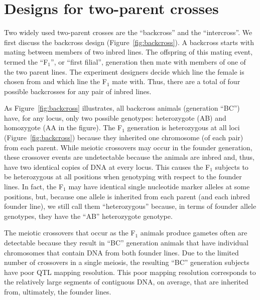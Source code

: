 \documentclass[oneside]{book}\usepackage[]{graphicx}\usepackage[]{color}
\begin{document}


\section{Designs for two-parent crosses}\label{sec:two-parent-designs}

Two widely used two-parent crosses are the ``backcross'' and the ``intercross''. We first discuss the backcross design (Figure~\ref{fig:backcross}). A backcross starts with mating between members of two inbred lines. The offspring of this mating event, termed the ``F$_1$'', or ``first filial'', generation then mate with members of one of the two parent lines. The experiment designers decide which line the female is chosen from and which line the F$_1$ mate with. Thus, there are a total of four possible backcrosses for any pair of inbred lines. 

As Figure~\ref{fig:backcross} illustrates, all backcross animals (generation ``BC'') have, for any locus, only two possible genotypes: heterozygote (AB) and homozygote (AA in the figure).
The F$_1$ generation is heterozygous at all loci (Figure~\ref{fig:backcross}) because 
they inherited one chromosome (of each pair) from each parent.
While meiotic crossovers may occur in the founder generation, these crossover events are
undetectable because the animals are inbred and, thus, have two identical copies
of DNA at every locus. This causes the F$_1$ subjects to be heterozygous at all positions
when genotyping with respect to the founder lines.
In fact, the F$_1$ may have identical single nucleotide marker alleles at some
positions, but, because one allele is inherited from each parent (and each inbred
founder line), we still call them ``heterozygous'' because, in terms of founder allele genotypes, they have the ``AB'' heterozygote genotype.

The meiotic crossovers that occur as the F$_1$ animals produce gametes often
are detectable because they result in ``BC'' generation animals that have individual
chromosomes that contain DNA from both founder lines. Due to the limited number
of crossovers in a single meiosis, the resulting ``BC'' generation subjects have
poor QTL mapping resolution.
This poor mapping resolution corresponds to the relatively large segments
of contiguous DNA, on average, that are inherited from, ultimately, the founder lines.
\end{document}
